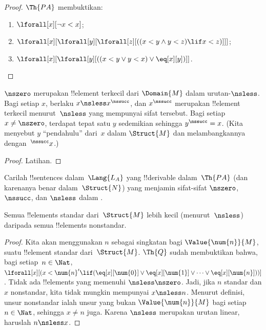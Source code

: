 \documentclass[../../../include/open-logic-section]{subfiles}
\begin{document}
\begin{proof}
$\Th{PA}$ membuktikan:
\begin{enumerate}
\item $\lforall[x][\lnot x < x]$;
\item $\lforall[x][\lforall[y][\lforall[z][((x < y \land y < z) \lif x < z)]]]$;
\item $\lforall[x][\lforall[y][((x < y \lor y < x) \lor \eq[x][y])]]$.
\end{enumerate}
\end{proof}

\begin{prop}
 $\nszero$ merupakan !!{element} terkecil dari
$\Domain{M}$ dalam urutan-$\nsless$. Bagi setiap $x$, berlaku
$x \nsless x^\nssucc$, dan $x^\nssucc$ merupakan !!{element} terkecil
menurut~$\nsless$ yang mempunyai sifat tersebut. Bagi setiap
$x \neq \nszero$, terdapat tepat satu $y$ sedemikian sehingga
$y^\nssucc = x$. (Kita menyebut $y$ ``pendahulu'' dari~$x$ dalam
$\Struct{M}$ dan melambangkannya dengan~$^\nssucc x$.)
\end{prop}

\begin{proof}
Latihan.
\end{proof}

\begin{prob}
Carilah !!{sentence}s dalam~$\Lang{L_A}$ yang !!{derivable} dalam~$\Th{PA}$
(dan karenanya benar dalam~$\Struct{N}$) yang menjamin sifat-sifat
$\nszero$, $\nssucc$, dan $\nsless$ dalam
.
\end{prob}

\begin{prop}
Semua !!{element}s standar dari~$\Struct{M}$ lebih kecil (menurut~$\nsless$)
daripada semua !!{element}s nonstandar.
\end{prop}

\begin{proof}
Kita akan menggunakan $n$ sebagai singkatan bagi $\Value{\num{n}}{M}$,
suatu !!{element} standar dari~$\Struct{M}$. $\Th{Q}$ sudah membuktikan
bahwa, bagi setiap~$n \in \Nat$,
$\lforall[x][(x < \num{n}' \lif (\eq[x][\num{0}] \lor
  \eq[x][\num{1}] \lor \dots \lor \eq[x][\num{n}]))]$. Tidak ada
!!{element}s yang memenuhi $\nsless \nszero$. Jadi, jika $n$ standar dan $x$
nonstandar, kita tidak mungkin mempunyai $x \nsless n$. Menurut definisi,
unsur nonstandar ialah unsur yang bukan $\Value{\num{n}}{M}$ bagi setiap
$n \in \Nat$, sehingga $x \neq n$ juga. Karena $\nsless$ merupakan urutan
linear, haruslah $n \nsless x$.
\end{proof}
\end{document}
